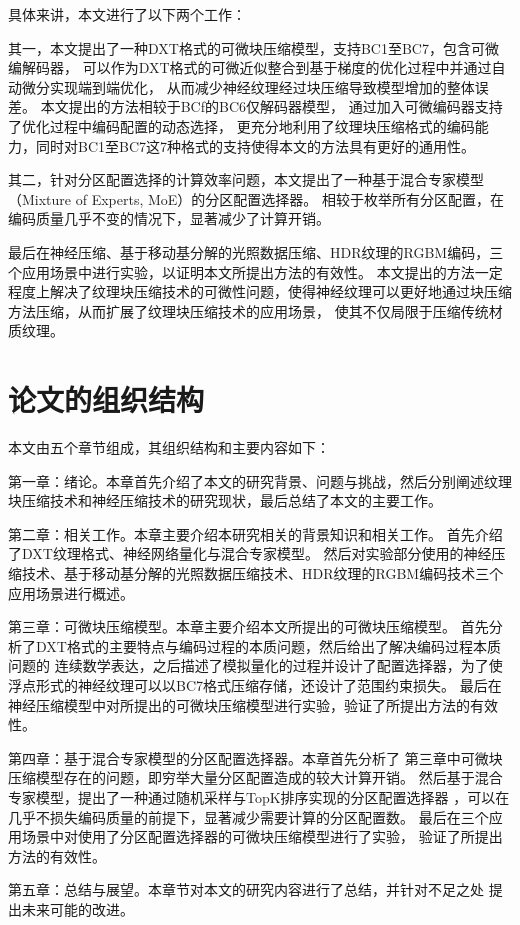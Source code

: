 具体来讲，本文进行了以下两个工作：

其一，本文提出了一种DXT格式的可微块压缩模型，支持BC1至BC7，包含可微编解码器，
可以作为DXT格式的可微近似整合到基于梯度的优化过程中并通过自动微分实现端到端优化，
从而减少神经纹理经过块压缩导致模型增加的整体误差。
本文提出的方法相较于BCf\cite{weinreich2024real}的BC6仅解码器模型，
通过加入可微编码器支持了优化过程中编码配置的动态选择，
更充分地利用了纹理块压缩格式的编码能力，同时对BC1至BC7这7种格式的支持使得本文的方法具有更好的通用性。

其二，针对分区配置选择的计算效率问题，本文提出了一种基于混合专家模型（Mixture of Experts, MoE）的分区配置选择器。
相较于枚举所有分区配置，在编码质量几乎不变的情况下，显著减少了计算开销。

最后在神经压缩\cite{weinreich2024real}、基于移动基分解的光照数据压缩\cite{silvennoinen2021moving}、HDR纹理的RGBM编码，三个应用场景中进行实验，以证明本文所提出方法的有效性。
本文提出的方法一定程度上解决了纹理块压缩技术的可微性问题，使得神经纹理可以更好地通过块压缩方法压缩，从而扩展了纹理块压缩技术的应用场景，
使其不仅局限于压缩传统材质纹理。

\section{论文的组织结构}

本文由五个章节组成，其组织结构和主要内容如下：

第一章：绪论。本章首先介绍了本文的研究背景、问题与挑战，然后分别阐述纹理
块压缩技术和神经压缩技术的研究现状，最后总结了本文的主要工作。

第二章：相关工作。本章主要介绍本研究相关的背景知识和相关工作。
首先介绍了DXT纹理格式、神经网络量化与混合专家模型。
然后对实验部分使用的神经压缩技术、基于移动基分解的光照数据压缩技术、HDR纹理的RGBM编码技术三个应用场景进行概述。

第三章：可微块压缩模型。本章主要介绍本文所提出的可微块压缩模型。
首先分析了DXT格式的主要特点与编码过程的本质问题，然后给出了解决编码过程本质问题的
连续数学表达，之后描述了模拟量化的过程并设计了配置选择器，为了使
浮点形式的神经纹理可以以BC7格式压缩存储，还设计了范围约束损失。
最后在神经压缩模型中对所提出的可微块压缩模型进行实验，验证了所提出方法的有效性。

第四章：基于混合专家模型的分区配置选择器。本章首先分析了
第三章中可微块压缩模型存在的问题，即穷举大量分区配置造成的较大计算开销。
然后基于混合专家模型，提出了一种通过随机采样与TopK排序实现的分区配置选择器
，可以在几乎不损失编码质量的前提下，显著减少需要计算的分区配置数。
最后在三个应用场景中对使用了分区配置选择器的可微块压缩模型进行了实验，
验证了所提出方法的有效性。

第五章：总结与展望。本章节对本文的研究内容进行了总结，并针对不足之处
提出未来可能的改进。

